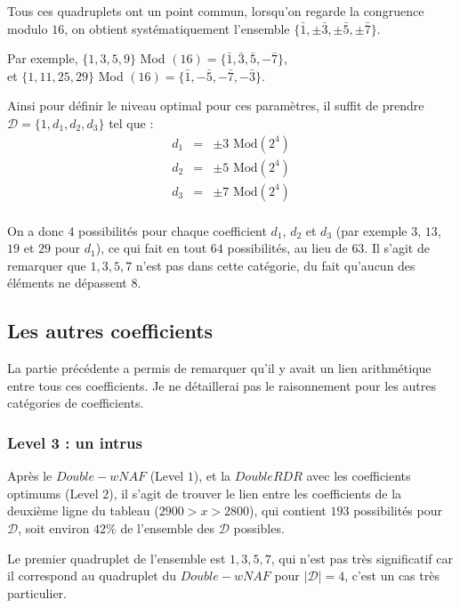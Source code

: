 \documentclass[12pt, a4paper]{memoir}
\begin{document}
  Tous ces quadruplets ont un point commun, lorsqu'on regarde la congruence modulo $16$, on obtient systématiquement
  l'ensemble $\{\bar{1},\pm\bar{3},\pm\bar{5},\pm\bar{7}\}$.
  
  Par exemple, $\{1,3,5,9\}$ Mod $(16) = \{\bar{1},\bar{3},\bar{5},-\bar{7}\}$, \\
  et $\{1,11,25,29\}$ Mod $(16) = \{\bar{1},-\bar{5},-\bar{7},-\bar{3}\}$.
  
  Ainsi pour définir le niveau optimal pour ces paramètres, il suffit de prendre 
  $\mathcal{D} = \{1,d_1,d_2,d_3\}$ tel que : \\
 $$\begin{array}{ccc}
d_1 & = & \pm 3 \,\, \text{Mod} (2^4) \\ 
d_2 & = & \pm 5 \,\, \text{Mod} (2^4) \\
d_3 & = & \pm 7 \,\, \text{Mod} (2^4) \\
   \end{array}$$
  
  On a donc $4$ possibilités pour chaque coefficient $d_1$, $d_2$ et $d_3$ (par exemple 
  $3$, $13$, $19$ et $29$ pour $d_1$), ce qui fait en tout $64$ possibilités, au lieu de $63$.
  Il s'agit de remarquer que $1,3,5,7$ n'est pas dans cette catégorie, du fait qu'aucun des éléments 
  ne dépassent $8$.
  
  \subsection{Les autres coefficients}
  
  La partie précédente a permis de remarquer qu'il y avait un lien arithmétique entre tous ces coefficients.
  Je ne détaillerai pas le raisonnement pour les autres catégories de coefficients.
  
  \subsubsection{Level 3 : un intrus}
  
  Après le $Double-wNAF$ (Level $1$), et la $DoubleRDR$ avec les coefficients optimums (Level $2$), il s'agit de 
  trouver le lien entre les coefficients de la deuxième ligne du tableau ($2900 > x > 2800$), qui contient
  $193$ possibilités pour $\mathcal{D}$, soit environ $42 \%$ de l'ensemble des $\mathcal{D}$ possibles.
  
  Le premier quadruplet de l'ensemble est $1,3,5,7$, qui n'est pas très significatif car il correspond au 
  quadruplet du $Double-wNAF$ pour $|\mathcal{D}| = 4$, c'est un cas très particulier.
  
\end{document}
